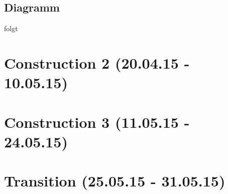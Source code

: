 \documentclass[11pt]{scrartcl}
\begin{document}
\subsection{Diagramm}
folgt
\section{Construction 2 (20.04.15 - 10.05.15)}

\section{Construction 3 (11.05.15 - 24.05.15)}

\section{Transition (25.05.15 - 31.05.15)}
\end{document}
